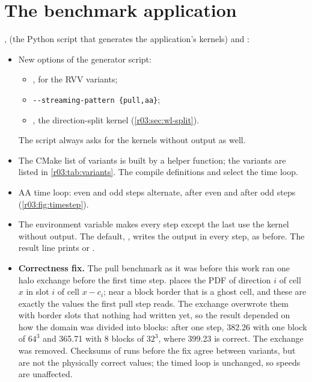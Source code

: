 \section{The benchmark application}\label{r03:sec:wl-app}

,
 (the Python script that generates the
application's kernels) and :
\begin{itemize}
  \item New options of the generator script:
        \begin{itemize}
          \item {}, for the RVV variants;
          \item \texttt{-{}-streaming-pattern \{pull,aa\}};
          \item {}, the direction-split kernel (\cref{r03:sec:wl-split}).
        \end{itemize}
        The script always asks  for the kernels without output as well.
  \item The CMake list of variants is built by a helper function; the variants are listed in
        \cref{r03:tab:variants}. The compile definitions  and
         select the time loop.
  \item AA time loop: even and odd steps alternate,  after even and
         after odd steps (\cref{r03:fig:timestep}).
  \item The environment variable  makes every step except the
        last use the kernel without output. The default, , writes the output in
        every step, as before. The result line prints  or
        .
  \item \textbf{Correctness fix.} The pull benchmark as it was before this work ran one halo
        exchange before the first time step.  places the PDF of direction $i$ of
        cell $x$ in slot $i$ of cell $x - c_i$; near a block border that is a ghost cell, and
        these are exactly the values the first pull step reads. The exchange overwrote them with
        border slots that nothing had written yet, so the result depended on how the domain was
        divided into blocks: after one step, 382.26 with one block of $64^3$ and 365.71 with 8
        blocks of $32^3$, where 399.23 is correct. The exchange was removed. Checksums of runs
        before the fix agree between variants, but are not the physically correct values; the
        timed loop is unchanged, so speeds are unaffected.
\end{itemize}

